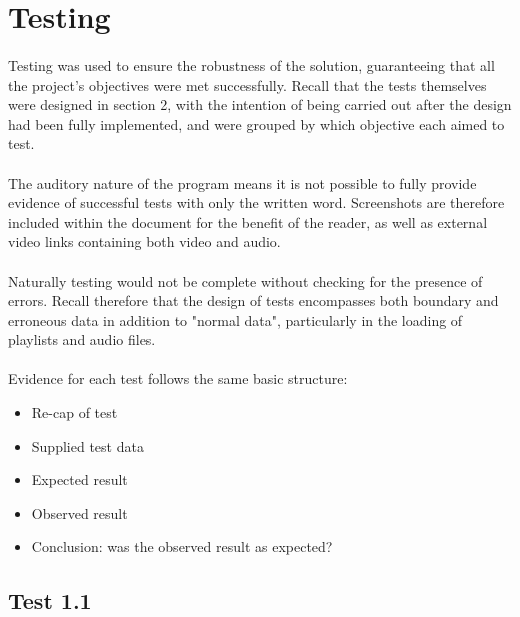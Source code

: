 \section {Testing}
\paragraph{}
Testing was used to ensure the robustness of the solution, guaranteeing that all the project's objectives were met successfully. Recall that the tests themselves were designed in section 2, with the intention of being carried out after the design had been fully implemented, and were grouped by which objective each aimed to test.

\paragraph{}
The auditory nature of the program means it is not possible to fully provide evidence of successful tests with only the written word. Screenshots are therefore included within the document for the benefit of the reader, as well as external video links containing both video and audio.

\paragraph{}
Naturally testing would not be complete without checking for the presence of errors. Recall therefore that the design of tests encompasses both boundary and erroneous data in addition to "normal data", particularly in the loading of playlists and audio files.

\paragraph{}
Evidence for each test follows the same basic structure:
\begin{itemize}
	\item Re-cap of test
	\item Supplied test data
	\item Expected result
	\item Observed result
	\item Conclusion: was the observed result as expected?
\end{itemize}

\pagebreak
\subsection{Test 1.1}
